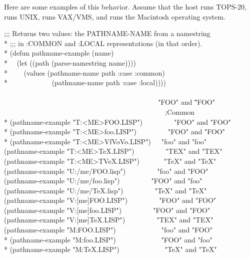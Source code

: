 \begin{newer}
\newpage%

Here are some examples of this behavior.  Assume that the host  runs
TOPS-20,  runs UNIX,  runs VAX/VMS, and  runs the Macintosh
operating system.
\begin{lisp}
;;; Returns two values: the PATHNAME-NAME from a namestring \\*
;;; in :COMMON and :LOCAL representations (in that order). \\*
(defun pathname-example (name) \\*
~~(let ((path (parse-namestring name)))) \\*
~~~~(values (pathname-name path :case :common) \\*
~~~~~~~~~~~~(pathname-name path :case :local)))) \\
\\
~~~~~~~~~~~~~~~~~~~~~~~~~~~~~~~~~~~~~~~~~~~\EV\ "FOO" {\rm and} \="FOO" \kill
~~~~~~~~~~~~~~~~~~~~~~~~~~~~~~~~~~~~~~~~~~~~~~;{\rm Common} \\*
(pathname-example "T:<ME>FOO.LISP")~~~~~~~~\EV\ "FOO" {\rm and} "FOO" \\*
(pathname-example "T:<ME>foo.LISP")~~~~~~~~\EV\ "FOO" {\rm and} "FOO" \\*
(pathname-example "T:<ME>{\Xcircumflex}Vf{\Xcircumflex}Vo{\Xcircumflex}Vo.LISP")~~\EV\ "foo" {\rm and} "foo" \\
(pathname-example "T:<ME>TeX.LISP")~~~~~~~~\EV\ "TEX" {\rm and} "TEX" \\
(pathname-example "T:<ME>T{\Xcircumflex}VeX.LISP")~~~~~~\EV\ "TeX" {\rm and} "TeX" \\
(pathname-example "U:/me/FOO.lisp")~~~~~~~~\EV\ "foo" {\rm and} "FOO" \\
(pathname-example "U:/me/foo.lisp")~~~~~~~~\EV\ "FOO" {\rm and} "foo" \\
(pathname-example "U:/me/TeX.lisp")~~~~~~~~\EV\ "TeX" {\rm and} "TeX" \\
(pathname-example "V:[me]FOO.LISP")~~~~~~~~\EV\ "FOO" {\rm and} "FOO" \\
(pathname-example "V:[me]foo.LISP")~~~~~~~~\EV\ "FOO" {\rm and} "FOO" \\
(pathname-example "V:[me]TeX.LISP")~~~~~~~~\EV\ "TEX" {\rm and} "TEX" \\
(pathname-example "M:FOO.LISP")~~~~~~~~~~~~\EV\ "foo" {\rm and} "FOO" \\*
(pathname-example "M:foo.LISP")~~~~~~~~~~~~\EV\ "FOO" {\rm and} "foo" \\*
(pathname-example "M:TeX.LISP")~~~~~~~~~~~~\EV\ "TeX" {\rm and} "TeX"

\end{lisp}
\end{newer}
